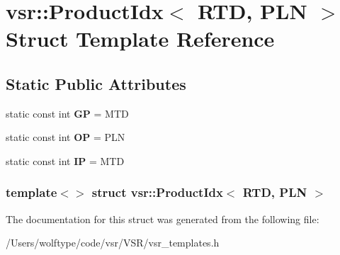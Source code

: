 \hypertarget{structvsr_1_1_product_idx_3_01_r_t_d_00_01_p_l_n_01_4}{\section{vsr\-:\-:Product\-Idx$<$ R\-T\-D, P\-L\-N $>$ Struct Template Reference}
\label{structvsr_1_1_product_idx_3_01_r_t_d_00_01_p_l_n_01_4}
}
\subsection*{Static Public Attributes}
\begin{DoxyCompactItemize}
\item 
\hypertarget{structvsr_1_1_product_idx_3_01_r_t_d_00_01_p_l_n_01_4_a122a12ad54608fbc92b559035c9d0f1a}{static const int {\bfseries G\-P} = M\-T\-D}\label{structvsr_1_1_product_idx_3_01_r_t_d_00_01_p_l_n_01_4_a122a12ad54608fbc92b559035c9d0f1a}

\item 
\hypertarget{structvsr_1_1_product_idx_3_01_r_t_d_00_01_p_l_n_01_4_adf13091a5eae24467d510bc3369ba38c}{static const int {\bfseries O\-P} = P\-L\-N}\label{structvsr_1_1_product_idx_3_01_r_t_d_00_01_p_l_n_01_4_adf13091a5eae24467d510bc3369ba38c}

\item 
\hypertarget{structvsr_1_1_product_idx_3_01_r_t_d_00_01_p_l_n_01_4_a5ffcd04eb2940a790cde043772d7788c}{static const int {\bfseries I\-P} = M\-T\-D}\label{structvsr_1_1_product_idx_3_01_r_t_d_00_01_p_l_n_01_4_a5ffcd04eb2940a790cde043772d7788c}

\end{DoxyCompactItemize}
\subsubsection*{template$<$$>$ struct vsr\-::\-Product\-Idx$<$ R\-T\-D, P\-L\-N $>$}



The documentation for this struct was generated from the following file\-:\begin{DoxyCompactItemize}
\item 
/\-Users/wolftype/code/vsr/\-V\-S\-R/vsr\-\_\-templates.\-h\end{DoxyCompactItemize}
